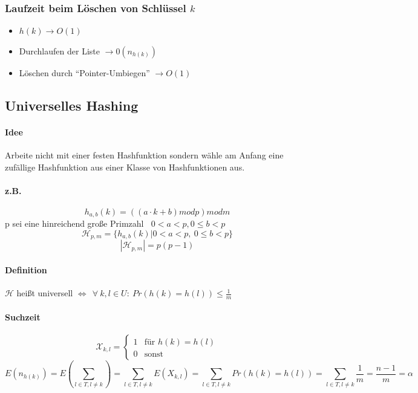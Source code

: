 \subsubsection{Laufzeit beim Löschen von Schlüssel $k$}
\begin{itemize}
	\item $h(k) \longrightarrow O(1)$
	\item Durchlaufen der Liste $\longrightarrow 0(n_{h(k)})$
	\item Löschen durch "`Pointer-Umbiegen"' $\longrightarrow O(1)$
\end{itemize}
\subsection{Universelles Hashing}
\paragraph*{Idee} Arbeite nicht mit einer festen Hashfunktion sondern wähle am Anfang eine zufällige Hashfunktion aus einer Klasse von Hashfunktionen aus.
\paragraph*{z.B.} \[ h_{a,b}(k)=((a\cdot k +b) mod p) mod m \]
p sei eine hinreichend große Primzahl$~~~~0<a<p, 0\leq b < p$
\[ \mathcal{H}_{p,m}=\{ h_{a,b}(k) | 0 < a < p, ~ 0 \leq b < p \} \]
\[ |\mathcal{H}_{p,m}| = p(p-1) \]
\paragraph*{Definition} $\mathcal{H}$ heißt universell $\Leftrightarrow~~\forall~k,l\in U:~ Pr(h(k)=h(l))\leq \frac{1}{m}$
\paragraph*{Suchzeit}
\[ \mathcal{X}_{k,l}=\begin{cases}1&\text{für }h(k)=h(l)\\0&\text{sonst}\end{cases} \]
\[ E(n_{h(k)})=E\left( \sum_{l \in T, l \neq k} \right) =  \sum_{l \in T, l \neq k} E(X_{k,l}) =  \sum_{l \in T, l \neq k} Pr(h(k)=h(l)) = \sum_{l \in T, l \neq k} \frac{1}{m} = \frac{n-1}{m} = \alpha \] 